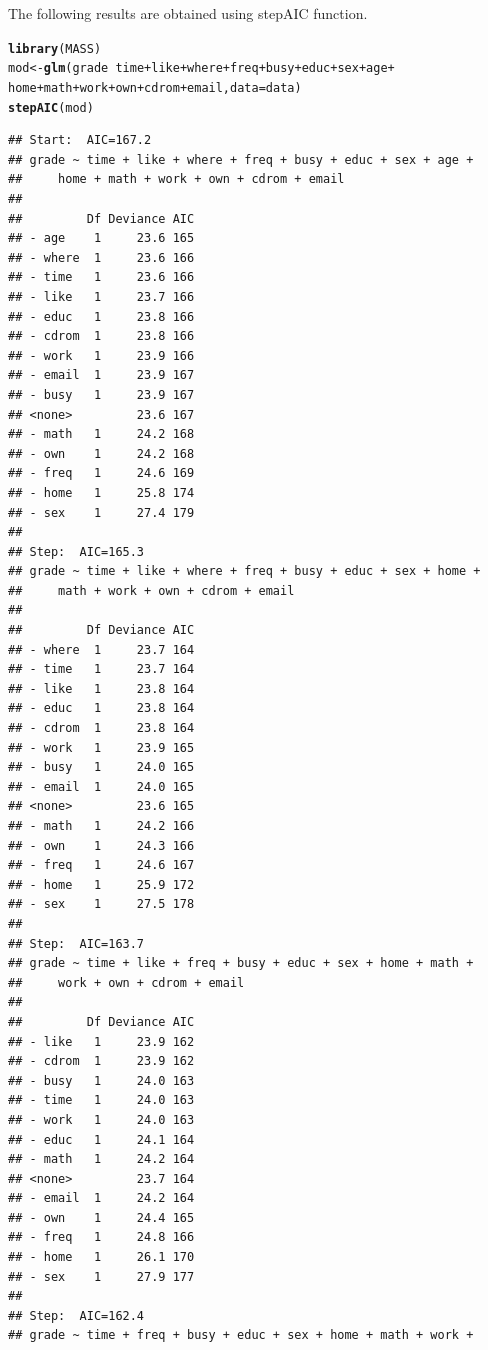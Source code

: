 \documentclass{article}\usepackage[]{graphicx}\usepackage[]{color}
\makeatletter
\newcommand{\hlopt}[1]{\textcolor[rgb]{0,0,0}{#1}}%
\newcommand{\hlstd}[1]{\textcolor[rgb]{0.345,0.345,0.345}{#1}}%
\newcommand{\hlkwb}[1]{\textcolor[rgb]{0.69,0.353,0.396}{#1}}%
\newcommand{\hlkwc}[1]{\textcolor[rgb]{0.333,0.667,0.333}{#1}}%
\newcommand{\hlkwd}[1]{\textcolor[rgb]{0.737,0.353,0.396}{\textbf{#1}}}%
\newenvironment{kframe}{%
 \def\at@end@of@kframe{}%
 \ifinner\ifhmode%
  \def\at@end@of@kframe{\end{minipage}}%
  \begin{minipage}{\columnwidth}%
 \fi\fi%
 \def\FrameCommand##1{\hskip\@totalleftmargin \hskip-\fboxsep
 \colorbox{shadecolor}{##1}\hskip-\fboxsep
     \hskip-\linewidth \hskip-\@totalleftmargin \hskip\columnwidth}%
 \MakeFramed {\advance\hsize-\width
   \@totalleftmargin\z@ \linewidth\hsize
   \@setminipage}}%
 {\par\unskip\endMakeFramed%
 \at@end@of@kframe}
\newenvironment{knitrout}{}{} %
\makeatother
\begin{document}
The following results are obtained using stepAIC function.

\begin{knitrout}
\color{fgcolor}\begin{kframe}
\begin{alltt}
\hlkwd{library}\hlstd{(MASS)}
\hlstd{mod} \hlkwb{<-} \hlkwd{glm}\hlstd{(grade} \hlopt{~} \hlstd{time} \hlopt{+} \hlstd{like} \hlopt{+} \hlstd{where} \hlopt{+} \hlstd{freq} \hlopt{+} \hlstd{busy} \hlopt{+} \hlstd{educ} \hlopt{+} \hlstd{sex} \hlopt{+} \hlstd{age} \hlopt{+}
            \hlstd{home} \hlopt{+} \hlstd{math} \hlopt{+} \hlstd{work} \hlopt{+} \hlstd{own} \hlopt{+} \hlstd{cdrom} \hlopt{+} \hlstd{email,} \hlkwc{data} \hlstd{= data)}
\hlkwd{stepAIC}\hlstd{(mod)}
\end{alltt}
\begin{verbatim}
## Start:  AIC=167.2
## grade ~ time + like + where + freq + busy + educ + sex + age + 
##     home + math + work + own + cdrom + email
## 
##         Df Deviance AIC
## - age    1     23.6 165
## - where  1     23.6 166
## - time   1     23.6 166
## - like   1     23.7 166
## - educ   1     23.8 166
## - cdrom  1     23.8 166
## - work   1     23.9 166
## - email  1     23.9 167
## - busy   1     23.9 167
## <none>         23.6 167
## - math   1     24.2 168
## - own    1     24.2 168
## - freq   1     24.6 169
## - home   1     25.8 174
## - sex    1     27.4 179
## 
## Step:  AIC=165.3
## grade ~ time + like + where + freq + busy + educ + sex + home + 
##     math + work + own + cdrom + email
## 
##         Df Deviance AIC
## - where  1     23.7 164
## - time   1     23.7 164
## - like   1     23.8 164
## - educ   1     23.8 164
## - cdrom  1     23.8 164
## - work   1     23.9 165
## - busy   1     24.0 165
## - email  1     24.0 165
## <none>         23.6 165
## - math   1     24.2 166
## - own    1     24.3 166
## - freq   1     24.6 167
## - home   1     25.9 172
## - sex    1     27.5 178
## 
## Step:  AIC=163.7
## grade ~ time + like + freq + busy + educ + sex + home + math + 
##     work + own + cdrom + email
## 
##         Df Deviance AIC
## - like   1     23.9 162
## - cdrom  1     23.9 162
## - busy   1     24.0 163
## - time   1     24.0 163
## - work   1     24.0 163
## - educ   1     24.1 164
## - math   1     24.2 164
## <none>         23.7 164
## - email  1     24.2 164
## - own    1     24.4 165
## - freq   1     24.8 166
## - home   1     26.1 170
## - sex    1     27.9 177
## 
## Step:  AIC=162.4
## grade ~ time + freq + busy + educ + sex + home + math + work + 

\end{verbatim}
\end{kframe}
\end{knitrout}
\end{document}
